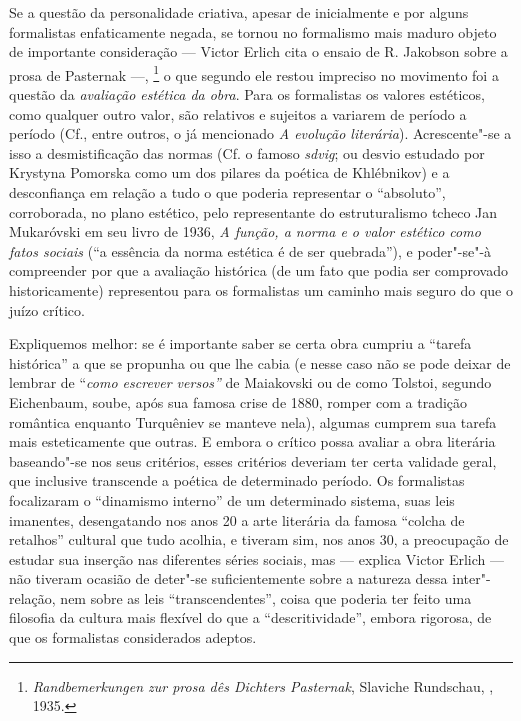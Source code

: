 Se a questão da personalidade criativa, apesar de inicialmente e por
alguns formalistas enfaticamente negada, se tornou no formalismo mais
maduro objeto de importante consideração --- Victor Erlich cita o ensaio
de R. Jakobson sobre a prosa de Pasternak ---, \footnote{\emph{Randbemerkungen
  zur prosa dês Dichters Pasternak}, Slaviche Rundschau, , 1935.} o
que segundo ele restou impreciso no movimento foi a questão da
\emph{avaliação estética da obra}. Para os formalistas os valores
estéticos, como qualquer outro valor, são relativos e sujeitos a
variarem de período a período (Cf., entre outros, o já mencionado
\emph{A evolução literária}). Acrescente"-se a isso a desmistificação das
normas (Cf. o famoso \emph{sdvig}; ou desvio estudado por Krystyna
Pomorska como um dos pilares da poética de Khlébnikov) e a desconfiança
em relação a tudo o que poderia representar o ``absoluto'', corroborada,
no plano estético, pelo representante do estruturalismo tcheco Jan
Mukaróvski em seu livro de 1936, \emph{A função, a norma e o valor
estético como fatos sociais} (``a essência da norma estética é de ser
quebrada''), e poder"-se"-à compreender por que a avaliação histórica (de
um fato que podia ser comprovado historicamente) representou para os
formalistas um caminho mais seguro do que o juízo crítico.

Expliquemos melhor: se é importante saber se certa obra cumpriu a
``tarefa histórica'' a que se propunha ou que lhe cabia (e nesse caso
não se pode deixar de lembrar de ``\emph{como escrever versos''} de
Maiakovski ou de como Tolstoi, segundo Eichenbaum, soube, após sua
famosa crise de 1880, romper com a tradição romântica enquanto
Turquêniev se manteve nela), algumas cumprem sua tarefa mais
esteticamente que outras. E embora o crítico possa avaliar a obra
literária baseando"-se nos seus critérios, esses critérios deveriam ter
certa validade geral, que inclusive transcende a poética de determinado
período. Os formalistas focalizaram o ``dinamismo interno'' de um
determinado sistema, suas leis imanentes, desengatando nos anos 20 a
arte literária da famosa ``colcha de retalhos'' cultural que tudo
acolhia, e tiveram sim, nos anos 30, a preocupação de estudar sua
inserção nas diferentes séries sociais, mas --- explica Victor Erlich ---
não tiveram ocasião de deter"-se suficientemente sobre a natureza dessa
inter"-relação, nem sobre as leis ``transcendentes'', coisa que poderia
ter feito uma filosofia da cultura mais flexível do que a
``descritividade'', embora rigorosa, de que os formalistas considerados
adeptos.

